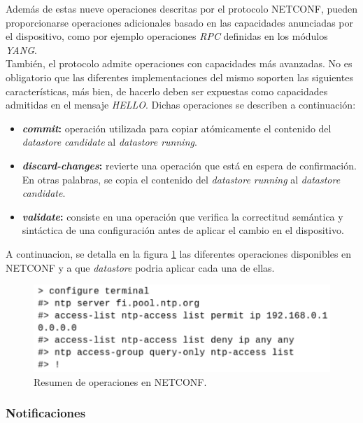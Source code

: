 Además de estas nueve operaciones descritas por el protocolo NETCONF, pueden proporcionarse operaciones adicionales basado en las capacidades anunciadas por el dispositivo, como por ejemplo operaciones \textit{RPC} definidas en los módulos \textit{YANG}.
\\
También, el protocolo admite operaciones con capacidades más avanzadas. No es obligatorio que las diferentes implementaciones del mismo soporten las siguientes características, más bien, de hacerlo deben ser expuestas como capacidades admitidas en el mensaje \textit{HELLO}. Dichas operaciones se describen a continuación:
\begin{itemize}
	\item \textbf{\textit{commit}:} operación utilizada para copiar atómicamente el contenido del \textit{datastore candidate} al \textit{datastore running}.
	\item \textbf{\textit{discard-changes}:} revierte una operación que está en espera de confirmación. En otras palabras, se copia el contenido del \textit{datastore running} al \textit{datastore candidate}.
	\item \textbf{\textit{validate}:} consiste en una operación que verifica la correctitud semántica y sintáctica de una configuración antes de aplicar el cambio en el dispositivo. 
\end{itemize}


A continuacion, se detalla en la figura \ref{fig:netconf_operaciones} las diferentes operaciones disponibles en NETCONF y a que \textit{datastore} podria aplicar cada una de ellas. 

\begin{figure}[htbp]
	\centering
	\includegraphics[scale=0.6]{Figures/cli.pdf}
	\caption{Resumen de operaciones en NETCONF.}
	\label{fig:netconf_operaciones}
  \end{figure}


  \subsubsection{Notificaciones}

